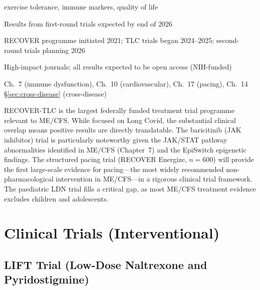 \begin{description}
        exercise tolerance, immune markers, quality of life
    \item[Estimated Completion:] Results from first-round trials expected
        by end of 2026
    \item[Timeline:] RECOVER programme initiated 2021; TLC trials began
        2024--2025; second-round trials planning 2026
    \item[Publication Medium:] High-impact journals; all results expected
        to be open access (NIH-funded)
    \item[Document Relevance:] Ch.~7 (immune dysfunction), Ch.~10
        (cardiovascular), Ch.~17 (pacing), Ch.~14
        \S\ref{sec:cross-disease} (cross-disease)
\end{description}

RECOVER-TLC is the largest federally funded treatment trial programme
relevant to ME/CFS.  While focused on Long Covid, the substantial clinical
overlap means positive results are directly translatable.  The baricitinib
(JAK inhibitor) trial is particularly noteworthy given the JAK/STAT pathway
abnormalities identified in ME/CFS (Chapter~7) and the EpiSwitch epigenetic
findings.  The structured pacing trial (RECOVER Energize, $n=600$) will
provide the first large-scale evidence for pacing---the most widely
recommended non-pharmacological intervention in ME/CFS---in a rigorous
clinical trial framework.  The paediatric LDN trial fills a critical gap,
as most ME/CFS treatment evidence excludes children and adolescents.

\section{Clinical Trials (Interventional)}
\label{sec:registry-interventional}

\subsection{LIFT Trial (Low-Dose Naltrexone and Pyridostigmine)}
\label{sec:registry-lift}

